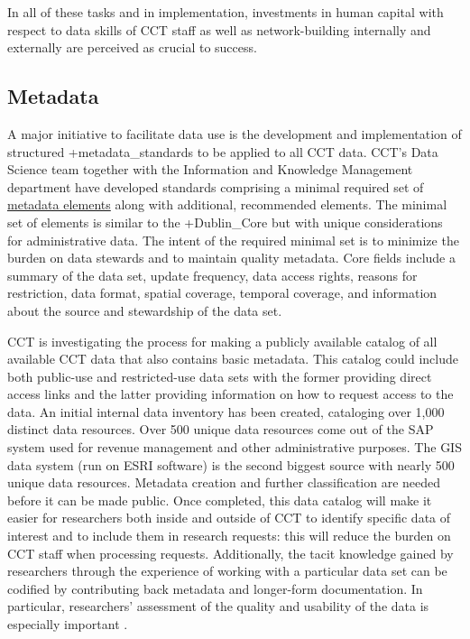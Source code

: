 \documentclass[
]{book}
\begin{document}
In all of these tasks and in implementation, investments in human capital with respect to data skills of CCT staff as well as network-building internally and externally are perceived as crucial to success.

\hypertarget{metadata-2}{%
\subsection{Metadata}\label{metadata-2}}

A major initiative to facilitate data use is the development and implementation of structured +metadata\_standards\textbar{} to be applied to all CCT data. CCT's Data Science team together with the Information and Knowledge Management department have developed standards comprising a minimal required set of \href{http://osf.io/2a7ev}{metadata elements} along with additional, recommended elements. The minimal set of elements is similar to the +Dublin\_Core\textbar{} but with unique considerations for administrative data. The intent of the required minimal set is to minimize the burden on data stewards and to maintain quality metadata. Core fields include a summary of the data set, update frequency, data access rights, reasons for restriction, data format, spatial coverage, temporal coverage, and information about the source and stewardship of the data set.

CCT is investigating the process for making a publicly available catalog of all available CCT data that also contains basic metadata. This catalog could include both public-use and restricted-use data sets with the former providing direct access links and the latter providing information on how to request access to the data. An initial internal data inventory has been created, cataloging over 1,000 distinct data resources. Over 500 unique data resources come out of the SAP system used for revenue management and other administrative purposes. The GIS data system (run on ESRI software) is the second biggest source with nearly 500 unique data resources. Metadata creation and further classification are needed before it can be made public. Once completed, this data catalog will make it easier for researchers both inside and outside of CCT to identify specific data of interest and to include them in research requests: this will reduce the burden on CCT staff when processing requests. Additionally, the tacit knowledge gained by researchers through the experience of working with a particular data set can be codified by contributing back metadata and longer-form documentation. In particular, researchers' assessment of the quality and usability of the data is especially important \citep{connelly2016}.
\end{document}
